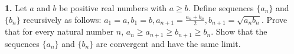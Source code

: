 \documentclass{homework}
\author{Kevin Joyce}
\begin{document}
 
\newcommand{\figref}[1]{\figurename~\ref{#1}}
\renewcommand{\bar}{\overline}
\renewcommand{\hat}{\widehat}
\renewcommand{\SS}{\mathcal S}
\newcommand{\eps}{\varepsilon}
\newcommand{\TTheta}{\overline{\underline \Theta} }
\newcommand{\del}{\partial}
\newcommand{\approxsim}{\overset{\cdotp}{\underset{\cdotp}{\sim}}}
\newcommand{\FF}{\mathcal F}
\renewcommand{\Re}{\mathrm{Re}\,}
\renewcommand{\Im}{\mathrm{Im}\,}
\newcommand{\HH}{\mathcal H}
\nocite{*}

{\bf 1.} Let $a$ and $b$ be positive real numbers with $a\ge b$. Define sequences $\{a_n\}$ and $\{b_n\}$ recursively as follows: $a_1 = a, b_1 = b,a_{n+1} = \frac{a_n+b_n}2, b_{n+1} = \sqrt{a_nb_n}$. Prove that for every natural number $n$, $a_n \ge a_{n+1} \ge b_{n+1} \ge b_n$.
 Show that the sequences $\{a_n\}$ and $\{b_n\}$ are convergent and have the same limit.


\end{document}
